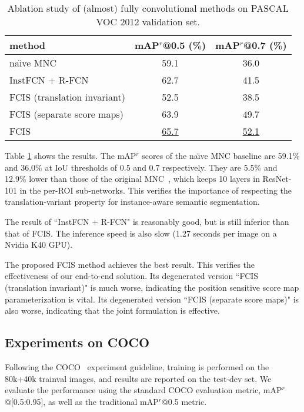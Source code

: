 \documentclass[10pt,twocolumn,letterpaper]{article}
\begin{document}
\setlength{\tabcolsep}{5pt}
\renewcommand{\arraystretch}{1.5}
\begin{table}
\begin{center}
\small
\begin{tabular}{l|c|c}
\hline
\footnotesize method & \scriptsize mAP$^r$@0.5 (\%) & \scriptsize mAP$^r$@0.7 (\%) \\
\hline
\hline
\footnotesize na\"{\i}ve MNC                      				 & 59.1 & 36.0 \\
\hline
\footnotesize InstFCN + R-FCN                                    & 62.7 & 41.5 \\
\hline
\footnotesize FCIS \scriptsize (translation invariant)    		 & 52.5 & 38.5 \\
\hline
\footnotesize FCIS \scriptsize (separate score maps)             & 63.9 & 49.7 \\
\hline
\footnotesize FCIS                                           & \underline{65.7} & \underline{52.1} \\
\hline
\end{tabular}
\end{center}
\caption{Ablation study of (almost) fully convolutional methods on PASCAL VOC 2012 validation set.}
\label{tab:ablation_voc}
\end{table}

Table \ref{tab:ablation_voc} shows the results. The  mAP$^r$ scores of the na\"{\i}ve MNC baseline are 59.1\% and 36.0\% at IoU thresholds of 0.5 and 0.7 respectively. They are 5.5\% and 12.9\% lower than those of the original MNC~\cite{dai2016mnc}, which keeps 10 layers in ResNet-101 in the per-ROI sub-networks. This verifies the importance of respecting the translation-variant property for instance-aware semantic segmentation.

The result of ``InstFCN + R-FCN" is reasonably good, but is still inferior than that of FCIS. The inference speed is also slow (1.27 seconds per image on a Nvidia K40 GPU).

The proposed FCIS method achieves the best result. This verifies the effectiveness of our end-to-end solution. Its degenerated version ``FCIS (translation invariant)" is much worse, indicating the position sensitive score map parameterization is vital. Its degenerated version ``FCIS (separate score maps)" is also worse, indicating that the joint formulation is effective.

\subsection{Experiments on COCO}
Following the COCO~\cite{lin2014coco} experiment guideline, training is performed on the 80k+40k trainval images, and results are reported on the test-dev set. We evaluate the performance using the standard COCO evaluation metric, mAP$^r$@[0.5:0.95], as well as the traditional mAP$^r$@0.5 metric.
\end{document}
